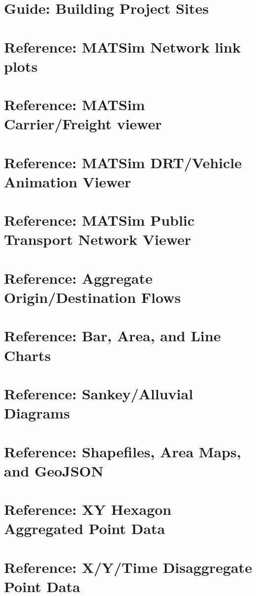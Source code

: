 \section{Guide: Building Project Sites}


\section{Reference: MATSim Network link plots}

\section{Reference: MATSim Carrier/Freight viewer}

\section{Reference: MATSim DRT/Vehicle Animation Viewer}

\section{Reference: MATSim Public Transport Network Viewer}


\section{Reference: Aggregate Origin/Destination Flows}

\section{Reference: Bar, Area, and Line Charts}

\section{Reference: Sankey/Alluvial Diagrams}

\section{Reference: Shapefiles, Area Maps, and GeoJSON}

\section{Reference: XY Hexagon Aggregated Point Data}

\section{Reference: X/Y/Time Disaggregate Point Data}

